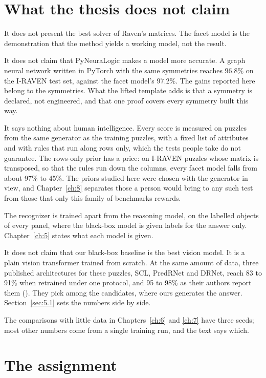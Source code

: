 \section{What the thesis does not claim}\label{sec:1.4}

It does not present the best solver of Raven's matrices. The facet model is the demonstration that the method yields a working model, not the result.

It does not claim that PyNeuraLogic makes a model more accurate. A graph neural network written in PyTorch with the same symmetries reaches 96.8\% on the I-RAVEN test set, against the facet model's 97.2\%. The gains reported here belong to the symmetries. What the lifted template adds is that a symmetry is declared, not engineered, and that one proof covers every symmetry built this way.

It says nothing about human intelligence. Every score is measured on puzzles from the same generator as the training puzzles, with a fixed list of attributes and with rules that run along rows only, which the tests people take do not guarantee. The rows-only prior has a price: on I-RAVEN puzzles whose matrix is transposed, so that the rules run down the columns, every facet model falls from about 97\% to 45\%. The priors studied here were chosen with the generator in view, and Chapter~\ref{ch:8} separates those a person would bring to any such test from those that only this family of benchmarks rewards.

The recognizer is trained apart from the reasoning model, on the labelled objects of every panel, where the black-box model is given labels for the answer only. Chapter~\ref{ch:5} states what each model is given.

It does not claim that our black-box baseline is the best vision model. It is a plain vision transformer trained from scratch. At the same amount of data, three published architectures for these puzzles, SCL, PredRNet and DRNet, reach 83 to 91\% when retrained under one protocol, and 95 to 98\% as their authors report them (\citealp{malkinski2025airaven}). They pick among the candidates, where ours generates the answer. Section~\ref{sec:5.1} sets the numbers side by side.

The comparisons with little data in Chapters~\ref{ch:6} and \ref{ch:7} have three seeds; most other numbers come from a single training run, and the text says which.

\section{The assignment}\label{sec:1.5}


